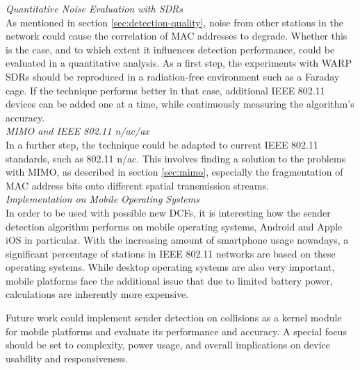 \clearpage
\textit{Quantitative Noise Evaluation with SDRs}\\

As mentioned in section \ref{sec:detection-quality}, noise from other stations in the network could cause the correlation of \gls{MAC} addresses to degrade. Whether this is the case, and to which extent it influences detection performance, could be evaluated in a quantitative analysis. As a first step, the experiments with \gls{WARP} \glspl{SDR} should be reproduced in a radiation-free environment such as a Faraday cage. If the technique performs better in that case, additional IEEE 802.11 devices can be added one at a time, while continuously measuring the algorithm's accuracy.\\

\textit{MIMO and IEEE 802.11 n/ac/ax}\\

In a further step, the technique could be adapted to current IEEE 802.11 standards, such as 802.11 n/ac. This involves finding a solution to the problems with \gls{MIMO}, as described in section \ref{sec:mimo}, especially the fragmentation of \gls{MAC} address bits onto different spatial transmission streams.\\

\textit{Implementation on Mobile Operating Systems}\\

In order to be used with possible new \glspl{DCF}, it is interesting how the sender detection algorithm performs on mobile operating systems, Android and Apple iOS in particular. With the increasing amount of smartphone usage nowadays, a significant percentage of stations in IEEE 802.11 networks are based on these operating systems. While desktop operating systems are also very important, mobile platforms face the additional issue that due to limited battery power, calculations are inherently more expensive.

Future work could implement sender detection on collisions as a kernel module for mobile platforms and evaluate its performance and accuracy. A special focus should be set to complexity, power usage, and overall implications on device usability and responsiveness.
